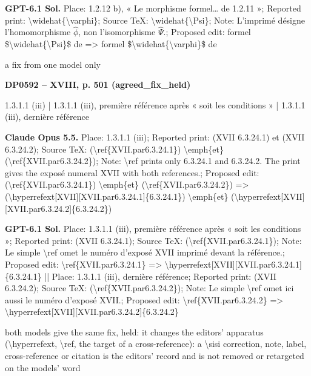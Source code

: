 \textbf{GPT-6.1 Sol.} Place: 1.2.12 b), « Le morphisme formel… de 1.2.11 »; Reported print: \textbackslash{}widehat\{\textbackslash{}varphi\}; Source TeX: \textbackslash{}widehat\{\textbackslash{}Psi\}; Note: L'imprimé désigne l'homomorphisme \ensuremath{\hat{\phi}}, non l'isomorphisme \ensuremath{\hat{\Psi}}.; Proposed edit: formel \$\textbackslash{}widehat\{\textbackslash{}Psi\}\$ de =\allowbreak > formel \$\textbackslash{}widehat\{\textbackslash{}varphi\}\$ de\par
a fix from one model only\par
\par\noindent\hypertarget{DP0592}{}\textbf{DP0592 -- XVIII, p. 501 (agreed\_fix\_held)}\par
1.3.1.1 (iii) | 1.3.1.1 (iii), première référence après « soit les conditions » | 1.3.1.1 (iii), dernière référence\par
\textbf{Claude Opus 5.5.} Place: 1.3.1.1 (iii); Reported print: (XVII 6.3.24.1) et (XVII 6.3.24.2); Source TeX: (\textbackslash{}ref\{XVII.par6.3.24.1\}) \textbackslash{}emph\{et\} (\textbackslash{}ref\{XVII.par6.3.24.2\}); Note: \textbackslash{}ref prints only 6.3.24.1 and 6.3.24.2. The print gives the exposé numeral XVII with both references.; Proposed edit: (\textbackslash{}ref\{XVII.par6.3.24.1\}) \textbackslash{}emph\{et\} (\textbackslash{}ref\{XVII.par6.3.24.2\}) =\allowbreak > (\textbackslash{}hyperrefext[XVII][XVII.par6.3.24.1]\{6.3.24.1\}) \textbackslash{}emph\{et\} (\textbackslash{}hyperrefext[XVII][XVII.par6.3.24.2]\{6.3.24.2\})\par
\textbf{GPT-6.1 Sol.} Place: 1.3.1.1 (iii), première référence après « soit les conditions »; Reported print: (XVII 6.3.24.1); Source TeX: (\textbackslash{}ref\{XVII.par6.3.24.1\}); Note: Le simple \textbackslash{}ref omet le numéro d'exposé XVII imprimé devant la référence.; Proposed edit: \textbackslash{}ref\{XVII.par6.3.24.1\} =\allowbreak > \textbackslash{}hyperrefext[XVII][XVII.par6.3.24.1]\{6.3.24.1\} || Place: 1.3.1.1 (iii), dernière référence; Reported print: (XVII 6.3.24.2); Source TeX: (\textbackslash{}ref\{XVII.par6.3.24.2\}); Note: Le simple \textbackslash{}ref omet ici aussi le numéro d'exposé XVII.; Proposed edit: \textbackslash{}ref\{XVII.par6.3.24.2\} =\allowbreak > \textbackslash{}hyperrefext[XVII][XVII.par6.3.24.2]\{6.3.24.2\}\par
both models give the same fix, held: it changes the editors' apparatus (\textbackslash{}hyperrefext, \textbackslash{}ref, the target of a cross-reference): a \textbackslash{}sisi correction, note, label, cross-reference or citation is the editors' record and is not removed or retargeted on the models' word\par
